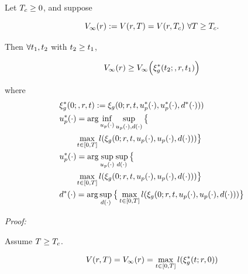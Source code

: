  \begin{claim}
   \label{thm:main}
   Let $T_c \ge 0$, and suppose
   
   \begin{equation}
   \label{eq:conv_valfunc}
   V_\infty(r) := V(r, T) = V(r, T_c) ~ \forall T \ge T_c.
   \end{equation}
   
   Then $\forall t_1, t_2$ with $t_2 \ge t_1$,
   
   \begin{equation}
   \label{eq:invariant}
   V_\infty(r) \ge V_\infty\Big(\xi_g^*(t_2;, r, t_1)\Big)
   \end{equation}
   
   \noindent where
   \begin{equation}
   \begin{aligned}
   & \xi_g^*(0;, r, t) := \xi_g(0; r, t, u_p^*(\cdot), u_p^*(\cdot), d^*(\cdot))) \\
   & u_p^*(\cdot) = \arg \inf_{u_p(\cdot)} \sup_{u_p(\cdot), d(\cdot)}\big\{ \\
   & \qquad \max_{t \in [0, T]} l(\xi_g(0; r, t, u_p(\cdot), u_p(\cdot), d(\cdot))) \big\}\\
   & u_p^*(\cdot) = \arg \sup_{u_p(\cdot)} \sup_{d(\cdot)} \big\{ \\
   & \qquad \max_{t \in [0, T]} l(\xi_g(0; r, t, u_p(\cdot), u_p(\cdot), d(\cdot))) \big\} \\
   & d^*(\cdot) = \arg \sup_{d(\cdot)} \big\{\max_{t \in [0, T]} l(\xi_g(0; r, t, u_p(\cdot), u_p(\cdot),  d(\cdot))) \big\}
   \end{aligned}
   \end{equation}
   
 \end{claim}
 
\textit{Proof:}

Assume $T \ge T_c$.

\begin{equation}
\begin{aligned}
V(r, T) &= V_\infty(r) = \max_{t \in [0, T]} l(\xi_g^*(t; r, 0))\\
\end{aligned}
\end{equation}

